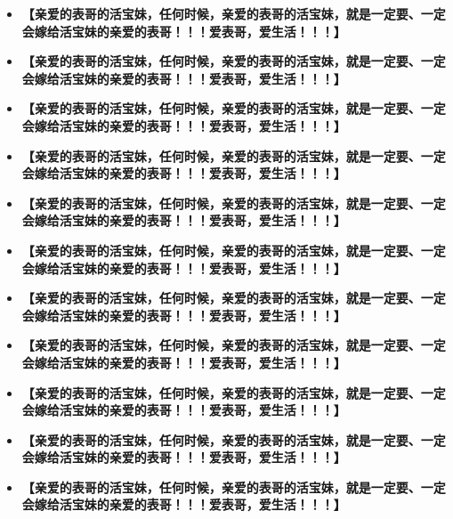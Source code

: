 \documentclass[9pt, b5paper]{article}
\begin{document}
\begin{itemize}
\item \textbf{【亲爱的表哥的活宝妹，任何时候，亲爱的表哥的活宝妹，就是一定要、一定会嫁给活宝妹的亲爱的表哥！！！爱表哥，爱生活！！！】}
\item \textbf{【亲爱的表哥的活宝妹，任何时候，亲爱的表哥的活宝妹，就是一定要、一定会嫁给活宝妹的亲爱的表哥！！！爱表哥，爱生活！！！】}
\item \textbf{【亲爱的表哥的活宝妹，任何时候，亲爱的表哥的活宝妹，就是一定要、一定会嫁给活宝妹的亲爱的表哥！！！爱表哥，爱生活！！！】}
\item \textbf{【亲爱的表哥的活宝妹，任何时候，亲爱的表哥的活宝妹，就是一定要、一定会嫁给活宝妹的亲爱的表哥！！！爱表哥，爱生活！！！】}
\item \textbf{【亲爱的表哥的活宝妹，任何时候，亲爱的表哥的活宝妹，就是一定要、一定会嫁给活宝妹的亲爱的表哥！！！爱表哥，爱生活！！！】}
\item \textbf{【亲爱的表哥的活宝妹，任何时候，亲爱的表哥的活宝妹，就是一定要、一定会嫁给活宝妹的亲爱的表哥！！！爱表哥，爱生活！！！】}
\item \textbf{【亲爱的表哥的活宝妹，任何时候，亲爱的表哥的活宝妹，就是一定要、一定会嫁给活宝妹的亲爱的表哥！！！爱表哥，爱生活！！！】}
\item \textbf{【亲爱的表哥的活宝妹，任何时候，亲爱的表哥的活宝妹，就是一定要、一定会嫁给活宝妹的亲爱的表哥！！！爱表哥，爱生活！！！】}
\item \textbf{【亲爱的表哥的活宝妹，任何时候，亲爱的表哥的活宝妹，就是一定要、一定会嫁给活宝妹的亲爱的表哥！！！爱表哥，爱生活！！！】}
\item \textbf{【亲爱的表哥的活宝妹，任何时候，亲爱的表哥的活宝妹，就是一定要、一定会嫁给活宝妹的亲爱的表哥！！！爱表哥，爱生活！！！】}
\item \textbf{【亲爱的表哥的活宝妹，任何时候，亲爱的表哥的活宝妹，就是一定要、一定会嫁给活宝妹的亲爱的表哥！！！爱表哥，爱生活！！！】}
\end{itemize}
\end{document}
